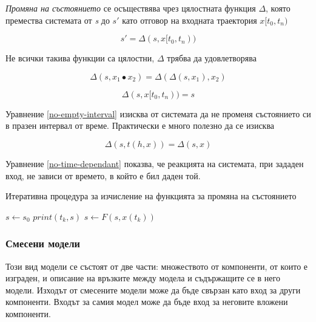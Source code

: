 			\emph{Промяна на състоянието} се осъществява чрез цялостната функция $\Delta$, която премества системата от \emph{s} до
			$s\prime$ като отговор на входната траектория $x[t_0, t_n)$
			
			\begin{equation}
				s\prime = \Delta(s, x[t_0, t_n))
			\end{equation}
			
			Не всички такива функции са цялостни, $\Delta$ трябва да удовлетворява
			
			\begin{equation}
				\Delta(s, x_1 \bullet x_2) = \Delta(\Delta(s, x_1), x_2)
			\end{equation}
			
			\begin{equation}\label{no-empty-interval}
				\Delta(s, x[t_0, t_n)) = s
			\end{equation}
			
			Уравнение \eqref{no-empty-interval} изисква от системата да не променя състоянието си
			в празен интервал от време. Практически е много полезно да се изисква
			
			\begin{equation}\label{no-time-dependant}
				\Delta(s, t(h, x)) = \Delta(s, x)
			\end{equation}
			
			Уравнение \eqref{no-time-dependant} показва, че реакцията на системата, при зададен вход, не зависи
			от времето, в който е бил даден той.
			
			\begin{algorithm}				
				\caption{Итеративна процедура за изчисление на функцията за промяна на състоянието}				
				\label{algorithm:state-transition}
				\begin{algorithmic}
					\State $s\gets s_0$
						\State $print(t_k, s)$
						\State $s\gets F(s, x(t_k))$
					\EndFor
				\end{algorithmic}
			\end{algorithm}
			
		\subsubsection{Смесени модели}
		
		Този вид модели се състоят от две части: множеството от компоненти, от които е изграден, и описание
		на връзките между модела и съдържащите се в него модели. Изходът от смесените модели
		може да бъде свързан като вход за други компоненти. Входът за самия модел може да бъде вход за
		неговите вложени компоненти.
		
